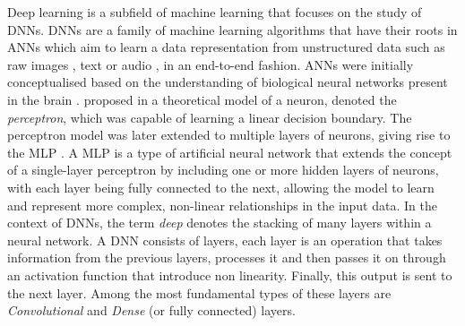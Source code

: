 Deep learning is a subfield of machine learning that focuses on the study of
\acp{DNN}. \acp{DNN} are a family of machine learning algorithms that have their
roots in \acp{ANN} which aim to learn a data representation from unstructured
data such as raw images \cite{DBLP:conf/nips/KrizhevskySH12}, text
\cite{DBLP:conf/emnlp/BudzianowskiV19} or audio
\cite{DBLP:journals/corr/HannunCCCDEPSSCN14}, in an end-to-end fashion.
\acp{ANN} were initially conceptualised based on the understanding of biological
neural networks present in the brain
\cite{mcculloch1943logical,hebb2005organization}.
\citeauthor{rosenblatt1958perceptron} proposed in
\cite{rosenblatt1958perceptron} a theoretical model of a neuron, denoted the
\emph{perceptron}, which was capable of learning a linear decision boundary. The
perceptron model was later extended to multiple layers of neurons, giving rise
to the \ac{MLP} \cite{rosenblatt1961principles,rumelhart1986learning}. A
\acl{MLP} is a type of artificial neural network that extends the concept of a
single-layer perceptron by including one or more hidden layers of neurons, with
each layer being fully connected to the next, allowing the model to learn and
represent more complex, non-linear relationships in the input data. In the
context of \acp{DNN}, the term \emph{deep} denotes the stacking of many layers
within a neural network. A \ac{DNN} consists of layers, each layer is an
operation that takes information from the previous layers, processes it and then
passes it on through an activation function
\cite{glorot2011deep,DBLP:journals/pieee/LeCunBBH98,klambauer2017self} that
introduce non linearity. Finally, this output is sent to the next layer. Among
the most fundamental types of these layers are \emph{Convolutional} and
\emph{Dense} (or fully connected) layers. \\

